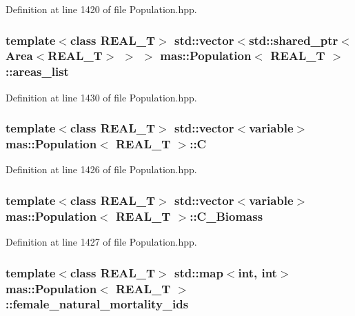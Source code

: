 Definition at line 1420 of file Population.\-hpp.

\hypertarget{classmas_1_1_population_a3633009c9043c6531989337ab8749ab3}{
\subsubsection[{areas\-\_\-list}]{\setlength{\rightskip}{0pt plus 5cm}template$<$class R\-E\-A\-L\-\_\-\-T$>$ std\-::vector$<$std\-::shared\-\_\-ptr$<${\bf Area}$<$R\-E\-A\-L\-\_\-\-T$>$ $>$ $>$ {\bf mas\-::\-Population}$<$ R\-E\-A\-L\-\_\-\-T $>$\-::areas\-\_\-list}}\label{classmas_1_1_population_a3633009c9043c6531989337ab8749ab3}


Definition at line 1430 of file Population.\-hpp.

\hypertarget{classmas_1_1_population_a878a062c7c1cb82ad02c0f42417c072c}{
\subsubsection[{C}]{\setlength{\rightskip}{0pt plus 5cm}template$<$class R\-E\-A\-L\-\_\-\-T$>$ std\-::vector$<${\bf variable}$>$ {\bf mas\-::\-Population}$<$ R\-E\-A\-L\-\_\-\-T $>$\-::C}}\label{classmas_1_1_population_a878a062c7c1cb82ad02c0f42417c072c}


Definition at line 1426 of file Population.\-hpp.

\hypertarget{classmas_1_1_population_ad3554c8cd3320e57770a1f793359c62f}{
\subsubsection[{C\-\_\-\-Biomass}]{\setlength{\rightskip}{0pt plus 5cm}template$<$class R\-E\-A\-L\-\_\-\-T$>$ std\-::vector$<${\bf variable}$>$ {\bf mas\-::\-Population}$<$ R\-E\-A\-L\-\_\-\-T $>$\-::C\-\_\-\-Biomass}}\label{classmas_1_1_population_ad3554c8cd3320e57770a1f793359c62f}


Definition at line 1427 of file Population.\-hpp.

\hypertarget{classmas_1_1_population_a87a2beba70c06531b7fcfab50f0ab76d}{
\subsubsection[{female\-\_\-natural\-\_\-mortality\-\_\-ids}]{\setlength{\rightskip}{0pt plus 5cm}template$<$class R\-E\-A\-L\-\_\-\-T$>$ std\-::map$<$int, int$>$ {\bf mas\-::\-Population}$<$ R\-E\-A\-L\-\_\-\-T $>$\-::female\-\_\-natural\-\_\-mortality\-\_\-ids}}\label{classmas_1_1_population_a87a2beba70c06531b7fcfab50f0ab76d}


